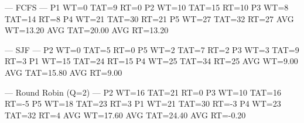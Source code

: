 
--- FCFS ---
P1 WT=0 TAT=9 RT=0
P2 WT=10 TAT=15 RT=10
P3 WT=8 TAT=14 RT=8
P4 WT=21 TAT=30 RT=21
P5 WT=27 TAT=32 RT=27
AVG WT=13.20
AVG TAT=20.00
AVG RT=13.20

--- SJF ---
P2 WT=0 TAT=5 RT=0
P5 WT=2 TAT=7 RT=2
P3 WT=3 TAT=9 RT=3
P1 WT=15 TAT=24 RT=15
P4 WT=25 TAT=34 RT=25
AVG WT=9.00
AVG TAT=15.80
AVG RT=9.00

--- Round Robin (Q=2) ---
P2 WT=16 TAT=21 RT=0
P3 WT=10 TAT=16 RT=-5
P5 WT=18 TAT=23 RT=3
P1 WT=21 TAT=30 RT=-3
P4 WT=23 TAT=32 RT=4
AVG WT=17.60
AVG TAT=24.40
AVG RT=-0.20
